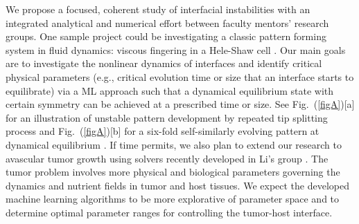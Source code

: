  We propose a focused, coherent study of interfacial instabilities with an integrated analytical and numerical effort between faculty mentors' research groups. One sample project could be investigating a classic pattern forming system in fluid dynamics: viscous fingering in a Hele-Shaw cell \cite{saffman1986}. Our main goals are to investigate the nonlinear dynamics of interfaces and identify critical physical parameters (e.g., critical evolution time or size that an interface starts to equilibrate) via a ML approach such that a dynamical equilibrium state with certain symmetry can be achieved at a prescribed time or size. See Fig.~(\ref{figA})[a] for an illustration of unstable pattern development by repeated tip splitting process and Fig.~(\ref{figA})[b] for a six-fold self-similarly evolving pattern at dynamical equilibrium \cite{Li2009}. If time permits, we also plan to extend our research to avascular tumor growth using solvers recently developed in Li's group \cite{MJ2020}. The tumor problem involves more physical and biological parameters governing the dynamics and nutrient fields in tumor and  host tissues. We expect the developed machine learning algorithms to be more explorative of parameter space and to determine optimal parameter ranges for controlling the tumor-host interface.






  




